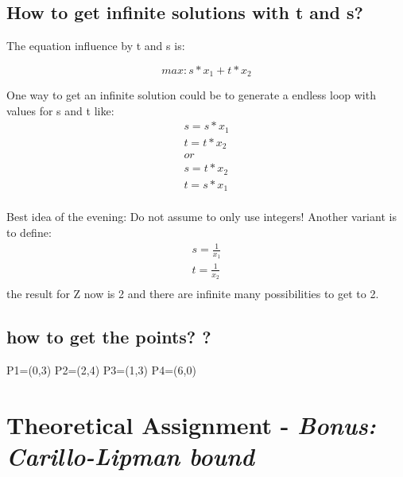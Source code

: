 \documentclass[%
   10pt,              %
   nenglish,           %
   a4paper,           %
   DIV11,             %
]{scrartcl}%
\begin{document}
\subsection*{How to get infinite solutions with t and s?}
The equation influence by t and s is:

\begin{equation*}
max: s*x_1+t*x_2
\end{equation*}

One way to get an infinite solution could be to generate a endless loop with values for s and t like:
\begin{eqnarray*}
s=s*x_1\label{inf1}\\ 
t=t*x_2 \label{inf2}\\ 
or\\
s=t*x_2\label{inf3}\\ 
t=s*x_1 \label{inf4}\\ 
\end{eqnarray*}


Best idea of the evening:
Do not assume to only use integers!
Another variant is to define:
\begin{eqnarray*}
	s=\frac{1}{x_1}\\
	t=\frac{1}{x_2}\\ 
\end{eqnarray*}
the result for Z now is 2 and there are infinite many possibilities to get to 2.

\subsection*{how to get the points? ?}

P1=(0,3)
P2=(2,4)
P3=(1,3)
P4=(6,0)

\section*{Theoretical Assignment - \textsl{Bonus: Carillo-Lipman bound}}

%
%
 
\end{document}
